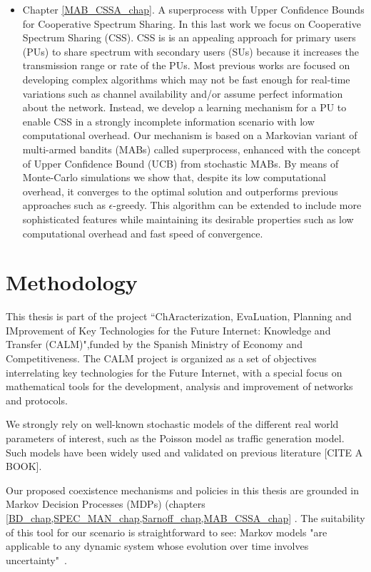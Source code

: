 \begin{itemize}
\item Chapter \ref{MAB_CSSA_chap}. A superprocess with Upper Confidence Bounds for Cooperative Spectrum Sharing. In this last work we focus on Cooperative Spectrum Sharing (CSS). CSS is is an appealing approach for primary users (PUs) to share spectrum with secondary users (SUs) because it increases the transmission range or rate of the PUs. Most previous works are focused on developing complex algorithms which may not be fast enough for real-time variations such as channel availability and/or assume perfect information about the network. Instead, we develop a learning mechanism for a PU to enable CSS in a strongly incomplete information scenario with low computational overhead. Our mechanism is based on a Markovian variant of multi-armed bandits (MABs) called superprocess, enhanced with the concept of Upper Confidence Bound (UCB) from stochastic MABs. By means of Monte-Carlo simulations we show that, despite its low computational overhead, it converges to the optimal solution and outperforms previous approaches such as $\epsilon$-greedy. This algorithm can be extended to include more sophisticated features while maintaining its desirable properties such as low computational overhead and fast speed of convergence. 
\end{itemize}

\section{Methodology}

This thesis is part of the project “ChAracterization, EvaLuation, Planning and IMprovement of Key Technologies for the Future Internet: Knowledge and Transfer (CALM)",funded by the Spanish Ministry of Economy and Competitiveness. The CALM project is organized as a set of objectives interrelating key technologies for the Future Internet, with a special focus on mathematical tools for the development, analysis and improvement of networks and protocols. 


We strongly rely on well-known stochastic models of the different real world parameters of interest, such as the Poisson model as traffic generation model. Such models have been widely used and validated on previous literature [CITE A BOOK]. 

Our proposed coexistence mechanisms and policies in this thesis are grounded in Markov Decision Processes (MDPs) (chapters \ref{BD_chap,SPEC_MAN_chap,Sarnoff_chap,MAB_CSSA_chap} \cite{ref:Puterman2005}. The suitability of this tool for our scenario is straightforward to see: Markov models "are applicable to any dynamic system whose evolution over time involves uncertainty" \cite{ref:Bertsekas}.

